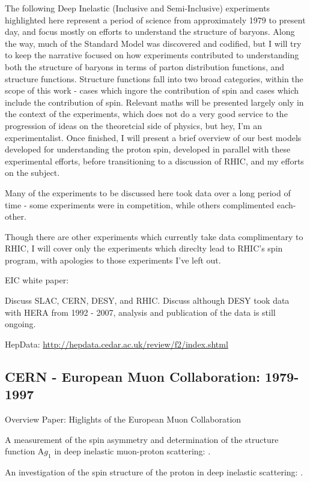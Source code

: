 The following Deep Inelastic (Inclusive and Semi-Inclusive) experiments
highlighted here represent a period of science from approximately 1979 to
present day, and focus mostly on efforts to understand the structure of baryons.
Along the way, much of the Standard Model was discovered and codified, but I
will try to keep the narrative focused on how experiments contributed to
understanding both the structure of baryons in terms of parton distribution
functions, and structure functions. Structure functions fall into two broad
categories, within the scope of this work - cases which ingore the contribution
of spin and cases which include the contribution of spin. Relevant maths will be
presented largely only in the context of the experiments, which does not do a
very good service to the progression of ideas on the theoretcial side of
physics, but hey, I'm an experimentalist. Once finished, I will present a brief
overview of our best models developed for understanding the proton spin,
developed in parallel with these experimental efforts, before transitioning to a
discussion of RHIC, and my efforts on the subject.

Many of the experiments to be discussed here took data over a long period of
time - some experiments were in competition, while others complimented
each-other.

Though there are other experiments which currently take data complimentary to
RHIC, I will cover only the experiments which direclty lead to RHIC's spin
program, with apologies to those experiments I've left out. 

EIC white paper:  \cite{Accardi2012}

Discuss SLAC, CERN, DESY, and RHIC. Discuss although DESY took data with HERA
from 1992 - 2007, analysis and publication of the data is still ongoing.

HepData: \url{http://hepdata.cedar.ac.uk/review/f2/index.shtml}


\subsection{CERN - European Muon Collaboration: 1979-1997}
Overview Paper: Higlights of the European Muon Collaboration
 \cite{Kullander1990a}

A measurement of the spin asymmetry and determination of the structure function
A$g_1$ in deep inelastic muon-proton scattering: \cite{Ashman1988}.

An investigation of the spin structure of the proton in deep inelastic
scattering:  \cite{Ashman1989}.

